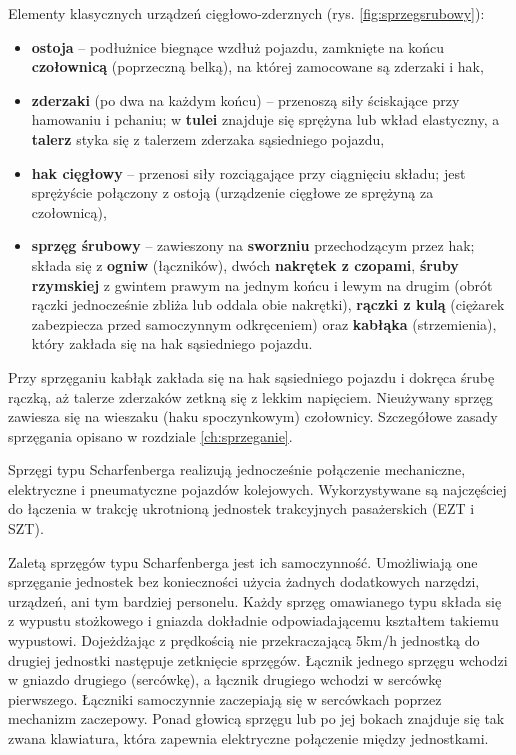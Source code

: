 Elementy klasycznych urządzeń cięgłowo-zderznych (rys. \ref{fig:sprzegsrubowy}):
\begin{itemize}
	\item \textbf{ostoja} – podłużnice biegnące wzdłuż pojazdu, zamknięte na końcu \textbf{czołownicą} (poprzeczną belką), na której zamocowane są zderzaki i hak,
	\item \textbf{zderzaki} (po dwa na każdym końcu) – przenoszą siły ściskające przy hamowaniu i pchaniu; w \textbf{tulei} znajduje się sprężyna lub wkład elastyczny, a \textbf{talerz} styka się z talerzem zderzaka sąsiedniego pojazdu,
	\item \textbf{hak cięgłowy} – przenosi siły rozciągające przy ciągnięciu składu; jest sprężyście połączony z ostoją (urządzenie cięgłowe ze sprężyną za czołownicą),
	\item \textbf{sprzęg śrubowy} – zawieszony na \textbf{sworzniu} przechodzącym przez hak; składa się z \textbf{ogniw} (łączników), dwóch \textbf{nakrętek z czopami}, \textbf{śruby rzymskiej} z gwintem prawym na jednym końcu i lewym na drugim (obrót rączki jednocześnie zbliża lub oddala obie nakrętki), \textbf{rączki z kulą} (ciężarek zabezpiecza przed samoczynnym odkręceniem) oraz \textbf{kabłąka} (strzemienia), który zakłada się na hak sąsiedniego pojazdu.
\end{itemize}

Przy sprzęganiu kabłąk zakłada się na hak sąsiedniego pojazdu i dokręca śrubę rączką, aż talerze zderzaków zetkną się z lekkim napięciem. Nieużywany sprzęg zawiesza się na wieszaku (haku spoczynkowym) czołownicy. Szczegółowe zasady sprzęgania opisano w rozdziale \ref{ch:sprzeganie}.


Sprzęgi typu Scharfenberga realizują jednocześnie połączenie mechaniczne, elektryczne i pneumatyczne pojazdów kolejowych. Wykorzystywane są najczęściej do łączenia w trakcję ukrotnioną jednostek trakcyjnych pasażerskich (EZT i SZT).

Zaletą sprzęgów typu Scharfenberga jest ich samoczynność. Umożliwiają one sprzęganie jednostek bez konieczności użycia żadnych dodatkowych narzędzi, urządzeń, ani tym bardziej personelu. Każdy sprzęg omawianego typu składa się z wypustu stożkowego i gniazda dokładnie odpowiadającemu kształtem takiemu wypustowi.
Dojeżdżając z prędkością nie przekraczającą 5km/h jednostką do drugiej jednostki następuje zetknięcie sprzęgów. Łącznik jednego sprzęgu wchodzi w gniazdo drugiego (sercówkę), a łącznik drugiego wchodzi w sercówkę pierwszego. Łączniki samoczynnie zaczepiają się w sercówkach poprzez mechanizm zaczepowy. Ponad głowicą sprzęgu lub po jej bokach znajduje się tak zwana klawiatura, która zapewnia elektryczne połączenie między jednostkami.

